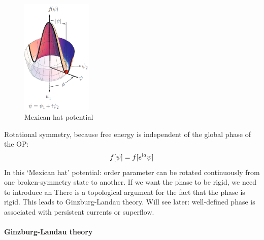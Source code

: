 \documentclass[../notes.tex]{subfiles}
\begin{document}
\begin{figure}[t]
	\centering
	\includegraphics[width=0.3\textwidth]{images/landau free energy mexican hat}
	\caption{Mexican hat potential}
	\label{fig:Landau free energy mexican hat potential}
\end{figure}

Rotational symmetry, because free energy is independent of the global phase of the OP:
\begin{equation}
	f [\psi] = f [e^{\mathrm{i} a } \psi]
\end{equation}
In this `Mexican hat' potential: order parameter can be rotated continuously from one broken-symmetry state to another.
If we want the phase to be rigid, we need to introduce an
There is a topological argument for the fact that the phase is rigid.
This leads to Ginzburg-Landau theory.
Will see later: well-defined phase is associated with persistent currents or superflow.

\paragraph{Ginzburg-Landau theory}
\end{document}
